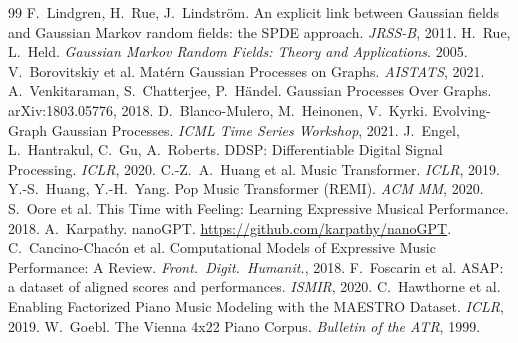 \documentclass[11pt,a4paper]{report}
\begin{document}
\begin{thebibliography}{99}
 F.~Lindgren, H.~Rue, J.~Lindstr\"om.
  An explicit link between Gaussian fields and Gaussian Markov random fields:
  the SPDE approach. \emph{JRSS-B}, 2011.
 H.~Rue, L.~Held.
  \emph{Gaussian Markov Random Fields: Theory and Applications}. 2005.
 V.~Borovitskiy et al.
  Mat\'ern Gaussian Processes on Graphs. \emph{AISTATS}, 2021.
 A.~Venkitaraman, S.~Chatterjee, P.~H\"andel.
  Gaussian Processes Over Graphs. arXiv:1803.05776, 2018.
 D.~Blanco-Mulero, M.~Heinonen, V.~Kyrki.
  Evolving-Graph Gaussian Processes. \emph{ICML Time Series Workshop}, 2021.
 J.~Engel, L.~Hantrakul, C.~Gu, A.~Roberts.
  DDSP: Differentiable Digital Signal Processing. \emph{ICLR}, 2020.
 C.-Z.~A.~Huang et al.
  Music Transformer. \emph{ICLR}, 2019.
 Y.-S.~Huang, Y.-H.~Yang.
  Pop Music Transformer (REMI). \emph{ACM MM}, 2020.
 S.~Oore et al.
  This Time with Feeling: Learning Expressive Musical Performance. 2018.
 A.~Karpathy. nanoGPT. \url{https://github.com/karpathy/nanoGPT}.
 C.~Cancino-Chac\'on et al.
  Computational Models of Expressive Music Performance: A Review.
  \emph{Front.\ Digit.\ Humanit.}, 2018.
 F.~Foscarin et al.
  ASAP: a dataset of aligned scores and performances. \emph{ISMIR}, 2020.
 C.~Hawthorne et al.
  Enabling Factorized Piano Music Modeling with the MAESTRO Dataset.
  \emph{ICLR}, 2019.
 W.~Goebl. The Vienna 4x22 Piano Corpus.
  \emph{Bulletin of the ATR}, 1999.
\end{thebibliography}
\end{document}
